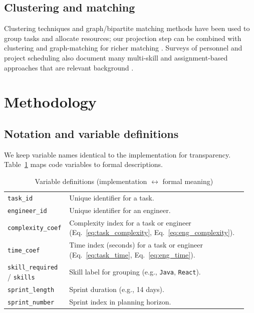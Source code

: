 \documentclass[journal]{IEEEtran}
\begin{document}
\subsection{Clustering and matching}
Clustering techniques and graph/bipartite matching methods have been used to group tasks and allocate resources; our projection step can be combined with clustering and graph-matching for richer matching \cite{clustering_tasks, bipartite_matching}. Surveys of personnel and project scheduling also document many multi-skill and assignment-based approaches that are relevant background \cite{WorkforceSchedSurvey2015, BurkardAssignmentBook}.

\section{Methodology}\label{sec:method}

\subsection{Notation and variable definitions}
We keep variable names identical to the implementation for transparency. Table~\ref{tab:variables} maps code variables to formal descriptions.

\begin{table}[ht]
    \centering
    \caption{Variable definitions (implementation $\leftrightarrow$ formal meaning)}
    \label{tab:variables}
    \begin{tabular}{p{0.22\linewidth} p{0.73\linewidth}}
    \toprule
    \texttt{task\_id} & Unique identifier for a task. \\
    \texttt{engineer\_id} & Unique identifier for an engineer. \\
    \texttt{complexity\_coef} & Complexity index for a task or engineer (Eq.~\ref{eq:task_complexity}, Eq.~\ref{eq:eng_complexity}). \\
    \texttt{time\_coef} & Time index (seconds) for a task or engineer (Eq.~\ref{eq:task_time}, Eq.~\ref{eq:eng_time}). \\
    \texttt{skill\_required} / \texttt{skills} & Skill label for grouping (e.g., \texttt{Java}, \texttt{React}). \\
    \texttt{sprint\_length} & Sprint duration (e.g., 14 days). \\
    \texttt{sprint\_number} & Sprint index in planning horizon. \\
    \bottomrule
    \end{tabular}
\end{table}
\end{document}
